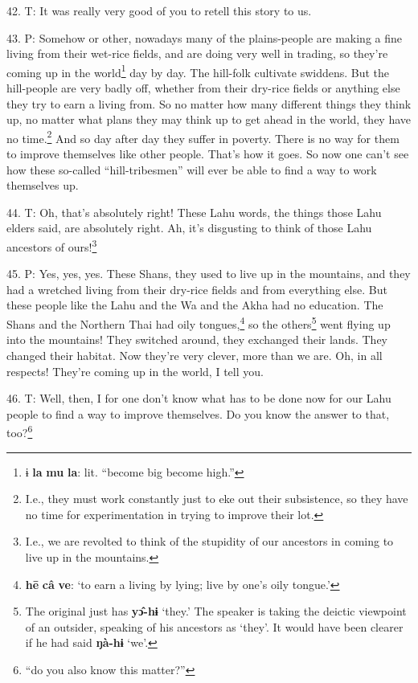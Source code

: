 42. T: It was really very good of you to retell this story to us.

43. P: Somehow or other, nowadays many of the plains-people are making a fine living
from their wet-rice fields, and are doing very well in trading, so they're coming
up in the world\footnote{ɨ \textbf{la} \textbf{mu} \textbf{la}: lit. ``become big become high.''} day by day. The hill-folk cultivate swiddens. But the hill-people
are very badly off, whether from their dry-rice fields or anything else they try
to earn a living from. So no matter how many different things they think up, no
matter what plans they may think up to get ahead in the world, they have no time.\footnote{I.e., they must work constantly just to eke out their subsistence, so they have no time for experimentation in trying to improve their lot.}
And so day after day they suffer in poverty. There is no way for them to improve
themselves like other people. That's how it goes. So now one can't see how these
so-called ``hill-tribesmen'' will ever be able to find a way to
work themselves up.

44. T: Oh, that's absolutely right! These Lahu words, the things those Lahu elders
said, are absolutely right. Ah, it's disgusting to think of those Lahu ancestors
of ours!\footnote{I.e., we are revolted to think of the stupidity of our ancestors in coming to live up in the mountains.}

45. P: Yes, yes, yes. These Shans, they used to live up in the mountains, and they
had a wretched living from their dry-rice fields and from everything else. But
these people like the Lahu and the Wa and the Akha had no education. The Shans
and the Northern Thai had oily tongues,\footnote{\textbf{hē} \textbf{câ} \textbf{ve}: `to earn a living by lying; live by one's oily tongue.'} so the others\footnote{The original just has \textbf{yɔ̂-hɨ} `they.' The speaker is taking the deictic viewpoint of an outsider, speaking of his ancestors as `they'. It would have been clearer if he had said \textbf{ŋà-hɨ} `we'.} went flying up into
the mountains! They switched around, they exchanged their lands. They changed their
habitat. Now they're very clever, more than we are. Oh, in all respects! They're
coming up in the world, I tell you.

46. T: Well, then, I for one don't know what has to be done now for our Lahu people
to find a way to improve themselves. Do you know the answer to that, too?\footnote{``do you also know this matter?''}

